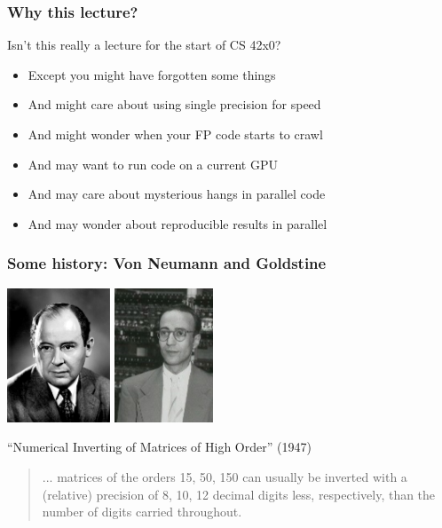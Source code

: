 \documentclass{beamer}
\begin{document}

\begin{frame}
  \titlepage
\end{frame}

\begin{frame}
  \frametitle{Why this lecture?}

  Isn't this really a lecture for the start of CS 42x0?
  \begin{itemize}
  \item Except you might have forgotten some things
  \item And might care about using single precision for speed
  \item And might wonder when your FP code starts to crawl
  \item And may want to run code on a current GPU
  \item And may care about mysterious hangs in parallel code
  \item And may wonder about reproducible results in parallel
  \end{itemize}
\end{frame}


\begin{frame}
  \frametitle{Some history: Von Neumann and Goldstine}

  \begin{center}
    \includegraphics[height=4cm]{figs/von-neumann.jpg}
    \includegraphics[height=4cm]{figs/goldstine.jpg}

    {\small ``Numerical Inverting of Matrices of High Order'' (1947)}
  \end{center}

  \begin{quote}
    ... matrices of the orders 15, 50, 150 can usually be inverted
    with a (relative) precision of 8, 10, 12 decimal digits less,
    respectively, than the number of digits carried throughout.
  \end{quote}

\end{frame}
\end{document}
